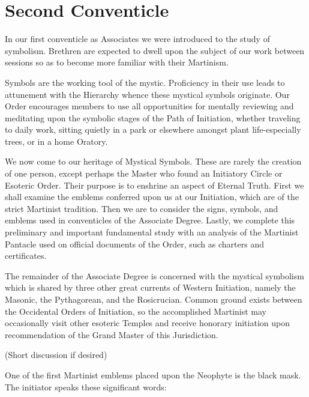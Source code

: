 \section{Second Conventicle}

In our first conventicle as Associates we were introduced to the study of symbolism. Brethren are
expected to dwell upon the subject of our work between sessions so as to become more familiar with
their Martinism.

Symbols are the working tool of the mystic. Proficiency in their use leads to attunement with the
Hierarchy whence these mystical symbols originate. Our Order encourages members to use all
opportunities for mentally reviewing and meditating upon the symbolic stages of the Path of Initiation,
whether traveling to daily work, sitting quietly in a park or elsewhere amongst plant life-especially
trees, or in a home Oratory.

We now come to our heritage of Mystical Symbols. These are rarely the creation of one person, except
perhaps the Master who found an Initiatory Circle or Esoteric Order. Their purpose is to enshrine an
aspect of Eternal Truth. First we shall examine the emblems conferred upon us at our Initiation, which
are of the strict Martinist tradition. Then we are to consider the signs, symbols, and emblems used in
conventicles of the Associate Degree. Lastly, we complete this preliminary and important fundamental
study with an analysis of the Martinist Pantacle used on official documents of the Order, such as
charters and certificates.

The remainder of the Associate Degree is concerned with the mystical symbolism which is shared by
three other great currents of Western Initiation, namely the Masonic, the Pythagorean, and the
Rosicrucian. Common ground exists between the Occidental Orders of Initiation, so the accomplished
Martinist may occasionally visit other esoteric Temples and receive honorary initiation upon
recommendation of the Grand Master of this Jurisdiction. 

{\centering
	(Short discussion if desired) 
}

One of the first Martinist emblems placed upon the Neophyte is the black mask. The initiator speaks
these significant words:

